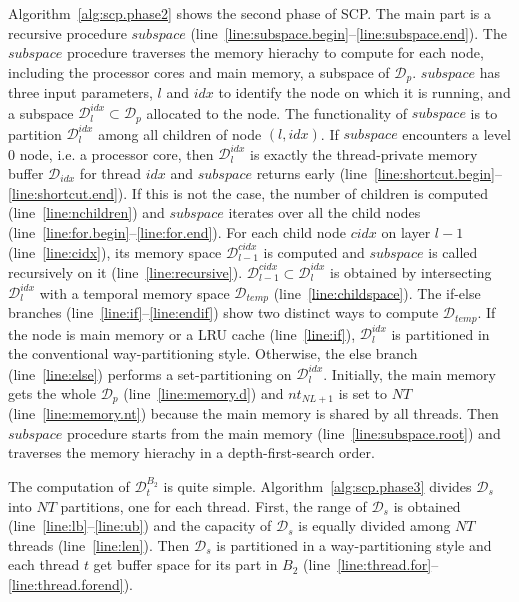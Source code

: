 Algorithm~\ref{alg:scp.phase2} shows the second phase of SCP.
The main part is a recursive procedure $subspace$
(line~\ref{line:subspace.begin}--\ref{line:subspace.end}).
The $subspace$ procedure traverses the memory hierachy
to compute for each node, including the processor cores and main memory,
a subspace of $\mathcal{D}_p$.
$subspace$ has three input parameters, $l$ and $idx$ to
identify the node on which it is running,
and a subspace $\mathcal{D}_l^{idx} \subset \mathcal{D}_p$ allocated to the node. 
The functionality of $subspace$ is to partition $\mathcal{D}_l^{idx}$
among all children of node $(l, idx)$.
If $subspace$ encounters a level 0 node, i.e. a processor core,
then $\mathcal{D}_l^{idx}$ is exactly the thread-private
memory buffer $\mathcal{D}_{idx}$ for thread $idx$ and $subspace$ returns early
(line~\ref{line:shortcut.begin}--\ref{line:shortcut.end}).
If this is not the case, the number of children is computed (line~\ref{line:nchildren})
and $subspace$ iterates over all the child nodes
(line~\ref{line:for.begin}--\ref{line:for.end}).
For each child node $cidx$ on layer $l-1$ (line~\ref{line:cidx}),
its memory space $\mathcal{D}_{l-1}^{cidx}$ is computed
and $subspace$ is called recursively on it (line~\ref{line:recursive}).
$\mathcal{D}_{l-1}^{cidx} \subset \mathcal{D}_l^{idx}$ is obtained
by intersecting $\mathcal{D}_l^{idx}$ with
a temporal memory space $\mathcal{D}_{temp}$ (line~\ref{line:childspace}).
The if-else branches (line~\ref{line:if}--\ref{line:endif})
show two distinct ways to compute $\mathcal{D}_{temp}$.
If the node is main memory or a LRU cache (line~\ref{line:if}),
$\mathcal{D}_l^{idx}$ is partitioned in the conventional
way-partitioning style.
Otherwise, the else branch (line~\ref{line:else}) performs
a set-partitioning on $\mathcal{D}_l^{idx}$.
Initially, the main memory gets the whole $\mathcal{D}_p$ (line~\ref{line:memory.d})
and $nt_{NL+1}$ is set to $NT$ (line~\ref{line:memory.nt})
because the main memory is shared by all threads.
Then $subspace$ procedure starts from the main memory (line~\ref{line:subspace.root})
and traverses the memory hierachy in a depth-first-search order.

The computation of $\mathcal{D}_t^{B_2}$ is quite simple.
Algorithm~\ref{alg:scp.phase3} divides $\mathcal{D}_s$
into $NT$ partitions, one for each thread.
First, the range of $\mathcal{D}_s$ is obtained
(line~\ref{line:lb}--\ref{line:ub}) and
the capacity of $\mathcal{D}_s$ is equally
divided among $NT$ threads (line~\ref{line:len}).
Then $\mathcal{D}_s$ is partitioned in a way-partitioning style
and each thread $t$ get buffer space for its part in $B_2$
(line~\ref{line:thread.for}--\ref{line:thread.forend}).

